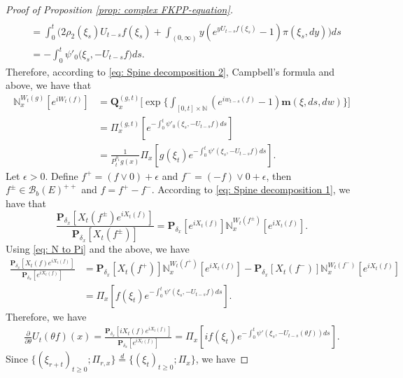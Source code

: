 \documentclass[12pt,a4paper]{amsart}
\theoremstyle{plain}
\theoremstyle{definition}
\numberwithin{equation}{section}
\begin{document}
\begin{proof}[Proof of Proposition \ref{prop: complex FKPP-equation}]
\begin{equation}
\begin{split}
    \\&=\int_0^t \Big( 2\rho_2(\xi_s) U_{t-s} f(\xi_s) + \int_{(0,\infty)} y (e^{y U_{t-s}f(\xi_s)} - 1) \pi(\xi_s,dy) \Big) ds
    \\&= -\int_0^t \psi'_0 \big(\xi_s, -U_{t-s}f\big)ds.
\end{split}\end{equation}
    Therefore, according to \eqref{eq: Spine decomposition 2}, Campbell's formula and above, we have that
\begin{equation}\begin{split}
\label{eq: N to Pi}
    \mathbb N_x^{W_t(g)}[e^{i W_t(f)}]
    &=\mathbf Q_x^{(g,t)} \Big[\exp\Big\{\int_{[0,t]\times \mathbb N}(e^{i w_{t-s}(f)} - 1) \mathbf m(\xi, ds,dw)\Big\}\Big]
    \\&= \Pi_x^{(g,t)} [e^{-\int_0^t \psi'_0(\xi_s, -U_{t-s}f)ds}]
    \\&= \frac{1}{P_t^{\rho_1} g (x)} \Pi_x[ g(\xi_t) e^{-\int_0^t \psi'(\xi_s, -U_{t-s}f)ds} ].
\end{split}\end{equation}
    Let $\epsilon >0$.
    Define $f^+ = (f \vee 0) + \epsilon$ and $f^- = (-f) \vee 0 + \epsilon$, then $f^\pm \in \mathcal B_b(E)^{++}$ and $f = f^+ - f^-$.
    According to \eqref{eq: Spine decomposition 1}, we have that
\begin{equation}
    \frac{\mathbf P_{\delta_x}[X_t(f^{\pm})e^{i X_t(f)}]}{\mathbf P_{\delta_x}[X_t(f^{\pm})]}
    = \mathbf P_{\delta_x}[e^{i X_t(f)}] \mathbb N_x^{W_t(f^{\pm})}[e^{i X_t(f)}].
\end{equation}
    Using \eqref{eq: N to Pi} and the above, we have
\begin{equation}\begin{split}
    \frac{\mathbf P_{\delta_x}[X_t(f)e^{i X_t(f)}] }{\mathbf P_{\delta_x}[e^{i X_t(f)}]}
    &= \mathbf P_{\delta_x}[X_t(f^+)] \mathbb N_x^{W_t(f^+)} [e^{i X_t(f)}] - \mathbf P_{\delta_x}[X_t(f^-)]\mathbb N_x^{W_t(f^-)}[e^{i X_t(f)}]
    \\& = \Pi_x[ f(\xi_t) e^{- \int_0^t \psi'(\xi_s, -U_{t-s}f) ds}  ].
\end{split}\end{equation}
    Therefore, we have
\begin{equation}\begin{split}
    \frac{\partial}{\partial \theta} {U_t(\theta f)(x)}
    = \frac{\mathbf P_{\delta_x}[iX_t(f)e^{i X_t(f)}] }{\mathbf P_{\delta_x}[e^{i X_t(f)}]}
    =  \Pi_x[ if(\xi_t) e^{ - \int_0^t \psi'(\xi_s, -U_{t-s}(\theta f)) ds} ].
\end{split}\end{equation}
    Since $\{(\xi_{r+t})_{t \geq 0}; \Pi_{r,x}\} \overset{d}{=} \{(\xi_{t})_{t\geq 0}; \Pi_{x}\} $, we have


\end{proof}
\end{document}
